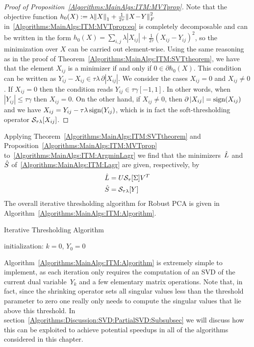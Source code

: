 \documentclass{../../common/projectreport}
\begin{document}
\begin{proof}[Proof of Proposition~\ref{Algorithms:MainAlgs:ITM:MVTprop}] 
Note that the objective function $h_0(X) := \lambda {\left\|X\right\|}_{1}^{} + \frac{1}{2\tau} {\left\|X\!-\!Y\right\|}_{F}^{2}$ in~\eqref{Algorithms:MainAlgs:ITM:MVTprop:eq} is completely decomposable and can be written in the form $h_0(X) = \sum_{i,j} \lambda |X_{ij}| + \frac{1}{2\tau} (X_{ij}\!-\!Y_{ij})^2$, so the minimization over $X$ can be carried out element-wise. Using the same reasoning as in the proof of Theorem~\ref{Algorithms:MainAlgs:ITM:SVTtheorem}, we have that the element $X_{ij}$ is a minimizer if and only if $0 \in \partial h_0(X)$. This condition can be written as $Y_{ij}-X_{ij} \in \tau \lambda\, \partial |X_{ij}|$. We consider the cases $X_{ij} =0$ and $X_{ij} \neq 0$. If $X_{ij} =0$ then the condition reads $Y_{ij} \in \tau \gamma [-1,1]$. In other words, when $|Y_{ij}| \leq \tau \gamma$ then $X_{ij}=0$. On the other hand, if $X_{ij} \neq 0$, then  $\partial \, |X_{ij}| = \operatorname{sign}(X_{ij})$ and we have $X_{ij}= Y_{ij} -\tau\lambda \operatorname{sign}(Y_{ij})$, which is in fact the soft-thresholding operator ${\mathcal{S}}_{\tau\lambda}[X_{ij}]$.
\end{proof}


Applying Theorem~\ref{Algorithms:MainAlgs:ITM:SVTtheorem} and Proposition~\ref{Algorithms:MainAlgs:ITM:MVTprop} to~\eqref{Algorithms:MainAlgs:ITM:ArgminLagr} we find that the minimizers~${\hat{L}}$ and~${\hat{S}}$ of~\eqref{Algorithms:MainAlgs:ITM:Lagr} are given, respectively, by 
%
\begin{align}
{\hat{L}} &= U {\mathcal{S}}_\tau[\Sigma] V^T
\label{Algorithms:MainAlgs:ITM:ArgminLhat} \\
{\hat{S}} &= {\mathcal{S}}_{\tau\lambda}[Y]
\label{Algorithms:MainAlgs:ITM:ArgminShat}
\end{align}
%
%
The overall iterative thresholding algorithm for Robust PCA is given in Algorithm~\ref{Algorithms:MainAlgs:ITM:Algorithm}. 
%
\begin{algorithm}
\caption{Iterative Thresholding Algorithm}
initialization: $k=0$, $Y_0 = 0$\;
\label{Algorithms:MainAlgs:ITM:Algorithm}
\end{algorithm}

Algorithm~\ref{Algorithms:MainAlgs:ITM:Algorithm} is extremely simple to implement, as each iteration only requires the computation of an SVD of the current dual variable~$Y_k$ and a few elementary matrix operations. Note that, in fact, since the shrinking operator sets all singular values less than the threshold parameter to zero one really only needs to compute the singular values that lie above this threshold. In section~\ref{Algorithms:Discussion:SVD:PartialSVD:Subsubsec} we will discuss how this can be exploited to achieve potential speedups in all of the algorithms considered in this chapter.
\end{document}
